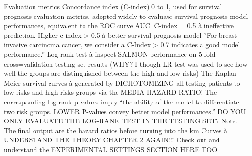 \documentclass{article}%
\begin{document}
\newline%
\newline%
%
%
\newline%
\newline%
%
%
\newline%
\newline%
%
%
\newline%
\newline%
%
Evaluation metrics %
\newline%
\newline%
%
Concordance index (C{-}index) 0 to 1, used for survival prognosis evaluation metrics, adopted widely to evaluate survival prognosis model performances, equivalent to the ROC curve AUC.%
\newline%
\newline%
%
C{-}index = 0.5 à ineffective prediction. Higher c{-}index > 0.5 à better survival prognosis model %
\newline%
\newline%
%
“For breast invasive carcinoma cancer, we consider a C{-}Index > 0.7 indicates a good model performance.” %
\newline%
\newline%
%
Log{-}rank test à inspect SALMON performance on 5{-}fold cross=validation testing set results (WHY? I though LR test was used to see how well the groups are distinguished between the high and low risks) %
\newline%
\newline%
%
The Kaplan{-}Meier survival curves à generated by DICHOTOMIZING all testing patients to low risks and high risks groups via the MEDIA HAZARD RATIO! %
\newline%
\newline%
%
The corresponding log{-}rank p{-}values imply “the ability of the model to differentiate two risk groups. LOWER P{-}values convey better model performances.”%
\newline%
\newline%
%
DO YOU ONLY EVALUATE THE LOG{-}RANK TEST IN THE TESTING SET? %
\newline%
\newline%
%
Note: The final output are the hazard ratios before turning into the km Curves à UNDERSTAND THE THEORY CHAPTER 2 AGAIN!!!%
\newline%
\newline%
%
Check out and understand the EXPERIMENTAL SETTINGS SECTION HERE TOO! %
\newline%
\newline%
\end{document}
